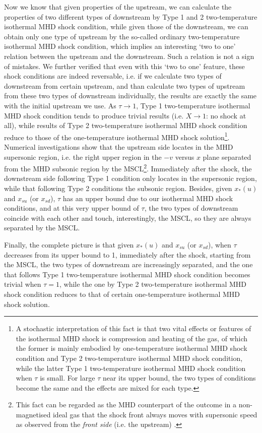 \documentclass[fleqn,usenatbib]{mnras}
\begin{document}
Now we know that given properties of the upstream, we can calculate the properties of two different types of downstream by Type 1 and 2 two-temperature isothermal MHD shock condition, while given those of the downstream, we can obtain only one type of upstream by the so-called ordinary two-temperature isothermal MHD shock condition, which implies an interesting `two to one' relation between the upstream and the downstream. Such a relation is not a sign of mistakes. We further verified that even with this `two to one' feature, these shock conditions are indeed reversable, i.e. if we calculate two types of downstream from certain upstream, and than calculate two types of upstream from these two types of downstream individually, the results are exactly the same with the initial upstream we use. As $\tau\rightarrow 1$, Type 1 two-temperature isothermal MHD shock condition tends to produce trivial results (i.e. $X\rightarrow 1$: no shock at all), while results of Type 2 two-temperature isothermal MHD shock condition reduce to those of the one-temperature isothermal MHD shock solution\footnote{A stochastic interpretation %
of this fact is that two vital effects or features of the isothermal MHD shock is compression and heating of the gas, of which the former is mainly embodied by one-temperature isothermal MHD shock condition and Type 2 two-temperature isothermal MHD shock condition, while the latter Type 1 two-temperature isothermal MHD shock condition when $\tau$ is small. For large $\tau$ near its upper bound, the two types of conditions become the same and the effects are mixed for each type.}. Numerical investigations show that the upstream side locates in the MHD supersonic region, i.e. the right upper region in the $-v$ versus $x$ plane separated from the MHD subsonic region by the MSCL\footnote{This fact can be regarded as the MHD counterpart of the outcome in a non-magnetised ideal gas that the shock front always moves with supersonic speed as observed from the \textit{front side} (i.e. the upstream) \citep{SFSW}.}. Immediately after the shock, the downstream side following Type 1 condition only locates in the supersonic region, while that following Type 2 conditions the subsonic region. Besides, given $x_{*}(u)$ and $x_{su}$ (or $x_{sd}$), $\tau$ has an upper bound due to our isothermal MHD shock conditions, and at this very upper bound of $\tau$, the two types of downstream coincide with each other and touch, interestingly, the MSCL, so they are always separated by the MSCL.

Finally, the complete picture is that given $x_{*}(u)$ and $x_{su}$ (or $x_{sd}$), when $\tau$ decreases from its upper bound to 1, immediately after the shock, starting from the MSCL, the two types of downstream are increasingly separated, and the one that follows Type 1 two-temperature isothermal MHD shock condition becomes trivial when $\tau=1$, while the one by Type 2 two-temperature isothermal MHD shock condition reduces to that of certain one-temperature isothermal MHD shock solution.
\end{document}
